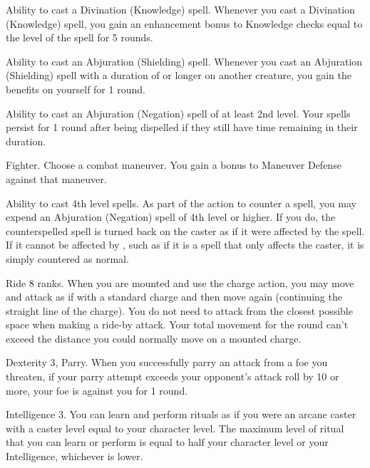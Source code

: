 \featpre Ability to cast a Divination (Knowledge) spell.
\featben Whenever you cast a Divination (Knowledge) spell, you gain an enhancement bonus to Knowledge checks equal to the level of the spell for 5 rounds.

\featpre Ability to cast an Abjuration (Shielding) spell.
\featben Whenever you cast an Abjuration (Shielding) spell with a duration of \durshort or longer on another creature, you gain the benefits on yourself for 1 round.

\featpre Ability to cast an Abjuration (Negation) spell of at least 2nd level.
\featben Your spells persist for 1 round after being dispelled if they still have time remaining in their duration.

\featpre Fighter.
\featben Choose a combat maneuver.
You gain a  bonus to Maneuver Defense against that maneuver.

\featpres
Ability to cast 4th level spells.
\featben As part of the action to counter a spell, you may expend an Abjuration (Negation) spell of 4th level or higher.
If you do, the counterspelled spell is turned back on the caster as if it were affected by the 
spell.
If it cannot be affected by , such as if it is a spell that only affects the caster, it is simply countered as normal.

\featpre Ride 8 ranks.
\featben When you are mounted and use the charge action, you may move and attack as if with a standard charge and then move again (continuing the straight line of the charge).
You do not need to attack from the closest possible space when making a ride-by attack.
Your total movement for the round can't exceed the distance you could normally move on a mounted charge.

\featpres Dexterity 3, Parry.
\featben When you successfully parry an attack from a foe you threaten, if your parry attempt exceeds your opponent's attack roll by 10 or more, your foe is  against you for 1 round.

\featpre Intelligence 3.
\featben You can learn and perform rituals as if you were an arcane caster with a caster level equal to your character level.
The maximum level of ritual that you can learn or perform is equal to half your character level or your Intelligence, whichever is lower.

